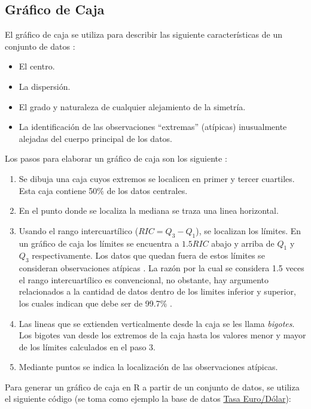 \documentclass[
  11pt,
]{book}
\providecommand{\tightlist}{%
  \setlength{\itemsep}{0pt}\setlength{\parskip}{0pt}}
\theoremstyle{definition}
\theoremstyle{definition}
\theoremstyle{definition}
\theoremstyle{definition}
\theoremstyle{remark}
\begin{document}
\subsection{Gráfico de Caja}\label{gruxe1fico-de-caja}

El gráfico de caja se utiliza para describir las siguiente características de un conjunto de datos \citep[página 35]{Devore}:

\begin{itemize}
\tightlist
\item
  El centro.
\item
  La dispersión.
\item
  El grado y naturaleza de cualquier alejamiento de la simetría.
\item
  La identificación de las observaciones ``extremas'' (atípicas) inusualmente alejadas del cuerpo principal de los datos.
\end{itemize}

Los pasos para elaborar un gráfico de caja son los siguiente \citep[página 106]{anderson}:

\begin{enumerate}
\def\labelenumi{\arabic{enumi}.}
\tightlist
\item
  Se dibuja una caja cuyos extremos se localicen en primer y tercer cuartiles. Esta caja contiene 50\% de los datos centrales.
\item
  En el punto donde se localiza la mediana se traza una linea horizontal.
\item
  Usando el rango intercuartílico (\(RIC = Q_3-Q_1\)), se localizan los límites. En un gráfico de caja los límites se encuentra a \(1.5RIC\) abajo y arriba de \(Q_1\) y \(Q_3\) respectivamente. Los datos que quedan fuera de estos límites se consideran observaciones atípicas \citep{Tukey}. La razón por la cual se considera 1.5 veces el rango intercuartílico es convencional, no obstante, hay argumento relacionados a la cantidad de datos dentro de los limites inferior y superior, los cuales indican que debe ser de 99.7\% \citep{James2013}.
\item
  Las lineas que se extienden verticalmente desde la caja se les llama \emph{bigotes}. Los bigotes van desde los extremos de la caja hasta los valores menor y mayor de los límites calculados en el paso 3.
\item
  Mediante puntos se indica la localización de las observaciones atípicas.
\end{enumerate}

Para generar un gráfico de caja en R a partir de un conjunto de datos, se utiliza el siguiente código (se toma como ejemplo la base de datos \hyperref[TasaEURUSD]{Tasa Euro/Dólar}):
\end{document}
